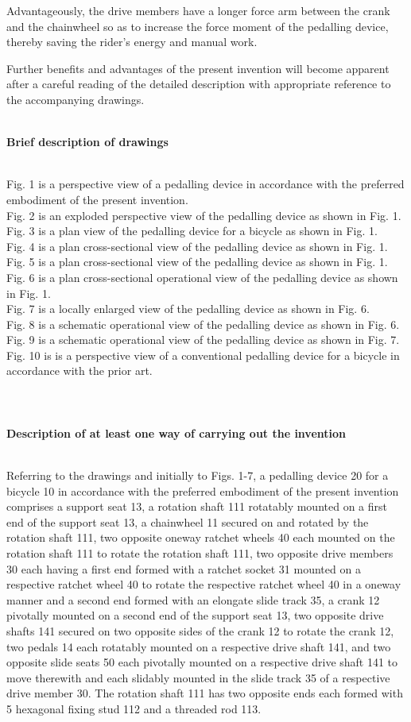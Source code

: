 \documentclass[10pt, a4paper]{article}
\newcommand{\mydescriptionline}[2]{
	\textbf{#1}\\\\
	\normalsize
	#2\\\\
}
\newcommand{\myfiguredescription}[2]{%
	\normalsize
	Fig. #1 is #2.\\
}
\begin{document}
{{			Advantageously, the drive members have a longer force arm between the crank and the chainwheel so as to increase the force moment of the pedalling device, thereby saving the rider’s energy and manual work. \newline
			
			Further benefits and advantages of the present invention will become apparent after a careful reading of the detailed description with appropriate reference to the accompanying drawings. 
		}	\\
		\mydescriptionline{Brief description of drawings}{
			\myfiguredescription{1}{a perspective view of a pedalling device in accordance with the preferred embodiment of the present invention}
			\myfiguredescription{2}{an exploded perspective view of the pedalling device as shown in Fig. 1}
			\myfiguredescription{3}{a plan view of the pedalling device for a bicycle as shown in Fig. 1}
			\myfiguredescription{4}{a plan cross-sectional view of the pedalling device as shown in Fig. 1}
			\myfiguredescription{5}{a plan cross-sectional view of the pedalling device as shown in Fig. 1}
			\myfiguredescription{6}{a plan cross-sectional operational view of the pedalling device as shown in Fig. 1}
			\myfiguredescription{7}{a locally enlarged view of the pedalling device as shown in Fig. 6}
			\myfiguredescription{8}{a schematic operational view of the pedalling device as shown in Fig. 6}
			\myfiguredescription{9}{a schematic operational view of the pedalling device as shown in Fig. 7}
			\myfiguredescription{10}{is a perspective view of a conventional pedalling device for a bicycle in accordance with the prior art}	
		} \\
		\mydescriptionline{Description of at least one way of carrying out the invention}{
			Referring to the drawings and initially to Figs. 1-7, a pedalling device 20 for a bicycle 10 in accordance with the preferred embodiment of the present invention comprises a support
			seat 13, a rotation shaft 111 rotatably mounted on a first end of the support seat 13, a
			chainwheel 11 secured on and rotated by the rotation shaft 111, two opposite oneway
			ratchet wheels 40 each mounted on the rotation shaft 111 to rotate the rotation shaft 111,
			two opposite drive members 30 each having a first end formed with a ratchet socket 31
			mounted on a respective ratchet wheel 40 to rotate the respective ratchet wheel 40 in a
			oneway manner and a second end formed with an elongate slide track 35, a crank 12
			pivotally mounted on a second end of the support seat 13, two opposite drive shafts 141
			secured on two opposite sides of the crank 12 to rotate the crank 12, two pedals 14 each
			rotatably mounted on a respective drive shaft 141, and two opposite slide seats 50 each
			pivotally mounted on a respective drive shaft 141 to move therewith and each slidably
			mounted in the slide track 35 of a respective drive member 30.
			The rotation shaft 111 has two opposite ends each formed with 5 hexagonal fixing stud
			112 and a threaded rod 113. \newline
			
}}
\end{document}
